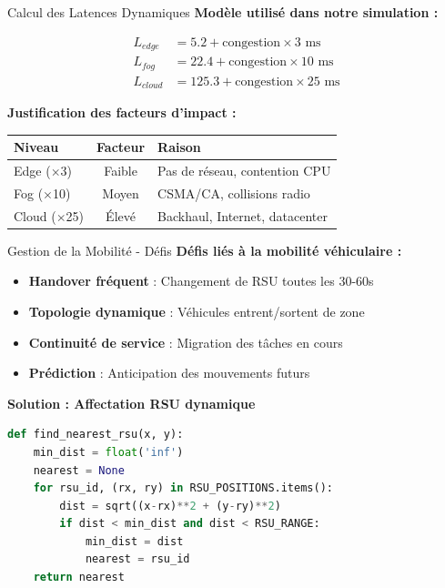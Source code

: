 ﻿\documentclass[aspectratio=169,11pt]{beamer}
\begin{document}
\begin{frame}{Calcul des Latences Dynamiques}
\textbf{Mod\`ele utilis\'e dans notre simulation :}

\begin{align}
L_{edge} &= 5.2 + \text{congestion} \times 3 \text{ ms} \\
L_{fog} &= 22.4 + \text{congestion} \times 10 \text{ ms} \\
L_{cloud} &= 125.3 + \text{congestion} \times 25 \text{ ms}
\end{align}

\textbf{Justification des facteurs d'impact :}
\begin{table}
\centering
\begin{tabular}{lcl}
\toprule
\textbf{Niveau} & \textbf{Facteur} & \textbf{Raison} \\
\midrule
Edge ($\times$3) & Faible & Pas de r\'eseau, contention CPU \\
Fog ($\times$10) & Moyen & CSMA/CA, collisions radio \\
Cloud ($\times$25) & \'Elev\'e & Backhaul, Internet, datacenter \\
\bottomrule
\end{tabular}
\end{table}
\end{frame}

\begin{frame}[fragile]{Gestion de la Mobilit\'e - D\'efis}
\textbf{D\'efis li\'es \`a la mobilit\'e v\'ehiculaire :}

\begin{itemize}
    \item \textbf{Handover fr\'equent} : Changement de RSU toutes les 30-60s
    \item \textbf{Topologie dynamique} : V\'ehicules entrent/sortent de zone
    \item \textbf{Continuit\'e de service} : Migration des t\^aches en cours
    \item \textbf{Pr\'ediction} : Anticipation des mouvements futurs
\end{itemize}

\vspace{0.3cm}
\textbf{Solution : Affectation RSU dynamique}
\begin{lstlisting}[language=Python]
def find_nearest_rsu(x, y):
    min_dist = float('inf')
    nearest = None
    for rsu_id, (rx, ry) in RSU_POSITIONS.items():
        dist = sqrt((x-rx)**2 + (y-ry)**2)
        if dist < min_dist and dist < RSU_RANGE:
            min_dist = dist
            nearest = rsu_id
    return nearest
\end{lstlisting}
\end{frame}
\end{document}
